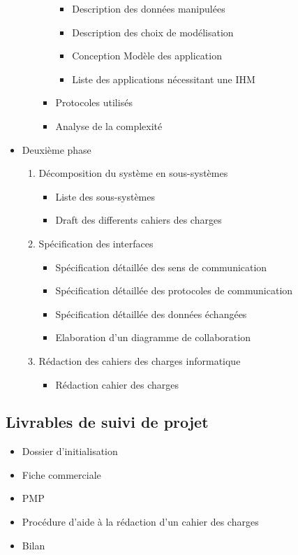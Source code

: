 \begin{itemize}
\begin{enumerate}
\begin{itemize}
\begin{itemize}
\item Description des données manipulées
\item Description des choix de modélisation      
\item Conception Modèle des application
\item Liste des applications nécessitant une IHM          
\end{itemize}          
\item Protocoles utilisés
\item Analyse de la complexité
\end{itemize}       
\end{enumerate} 
\item Deuxième phase
\begin{enumerate}
\item Décomposition du système en sous-systèmes 
\begin{itemize}
\item Liste des sous-systèmes 
\item Draft des differents cahiers des charges
\end{itemize}     
     

\item Spécification des interfaces
\begin{itemize}    
\item Spécification détaillée des sens de communication
\item Spécification détaillée des protocoles de communication
\item Spécification détaillée des données échangées
\item Elaboration d'un diagramme de collaboration
\end{itemize}        

\item Rédaction des cahiers des charges informatique
\begin{itemize}
\item Rédaction cahier des charges 
\end{itemize}
\end{enumerate}


\end{itemize}
\subsection{Livrables de suivi de projet}
\begin{itemize}
\item Dossier d'initialisation
\item Fiche commerciale
\item PMP
\item Procédure d'aide à la rédaction d'un cahier des charges
\item Bilan
\end{itemize}
